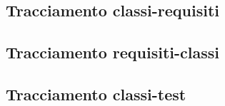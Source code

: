 \subsection{Tracciamento classi-requisiti}

\subsection{Tracciamento requisiti-classi}

\subsection{Tracciamento classi-test}
